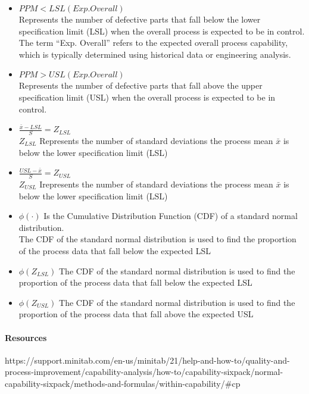 \documentclass[11pt]{article}
\begin{document}
\begin{itemize}
  \item \(PPM < LSL(Exp. Overall)\) 
  \\ Represents the number of defective parts that fall below the lower specification limit (LSL) when the
  overall process is expected to be in control. 
  \\ The term ``Exp. Overall'' refers to the expected overall process capability, which is typically
  determined using historical data or engineering analysis.

  \item \(PPM > USL(Exp. Overall)\) 
  \\ Represents the number of defective parts that fall above the
  upper specification limit (USL) when the overall process is expected to be in control.

  \item \( \frac{\bar x - LSL}{S} = Z_{LSL} \) 
  \\ \(Z_{LSL}\) Represents the number of standard deviations the process mean \(\bar x\) is below the lower specification limit (LSL)
  
  \item \( \frac{USL - \bar x}{S} = Z_{USL} \) 
  \\ \(Z_{USL}\) Irepresents the number of standard deviations the process mean \(\bar x\) is below the lower specification limit (LSL)  

  \item  \( \phi (\cdot) \) Is the Cumulative Distribution Function (CDF) of a standard normal distribution.
  \\ The CDF of the standard normal distribution is used to find the proportion of the process data that fall below the expected LSL
  \item  \( \phi (Z_{LSL}) \) The CDF of the standard normal distribution is used to find the proportion of the process data that fall below the expected LSL
  \item  \( \phi (Z_{USL}) \) The CDF of the standard normal distribution is used to find the proportion of the process data that fall above the expected USL
\end{itemize}

\hypertarget{resources}{%
\paragraph{Resources}\label{resources}}

https://support.minitab.com/en-us/minitab/21/help-and-how-to/quality-and-process-improvement/capability-analysis/how-to/capability-sixpack/normal-capability-sixpack/methods-and-formulas/within-capability/\#cp
\end{document}

